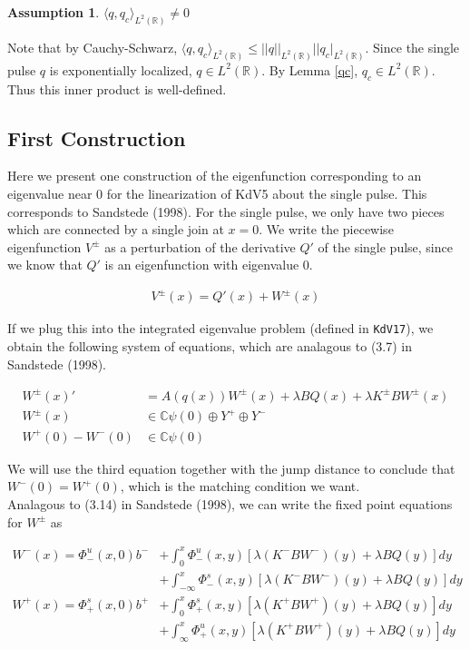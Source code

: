 \documentclass[12pt]{article}
\def\R{{\mathbb R}}
\def\C{{\mathbb C}}
\newtheorem{assumption}{Assumption}
\begin{document}
\begin{assumption}\label{qcIP}
$\langle q, q_c\rangle_{L^2(\R)} \neq 0$
\end{assumption}
Note that by Cauchy-Schwarz, $\langle q, q_c\rangle_{L^2(\R)} \leq ||q||_{L^2(\R)} ||q_c|_{L^2(\R)}$. Since the single pulse $q$ is exponentially localized, $q \in L^2(\R)$. By Lemma \ref{qc}, $q_c \in L^2(\R)$. Thus this inner product is well-defined.

\subsection*{First Construction}

Here we present one construction of the eigenfunction corresponding to an eigenvalue near 0 for the linearization of KdV5 about the single pulse. This corresponds to Sandstede (1998). For the single pulse, we only have two pieces which are connected by a single join at $x = 0$. We write the piecewise eigenfunction $V^\pm$ as a perturbation of the derivative $Q'$ of the single pulse, since we know that $Q'$ is an eigenfunction with eigenvalue 0. 

\begin{align*}
V^\pm(x) = Q'(x) + W^\pm(x)
\end{align*}

If we plug this into the integrated eigenvalue problem (defined in \texttt{KdV17}), we obtain the following system of equations, which are analagous to (3.7) in Sandstede (1998).

\begin{align*}
W^\pm(x)' &= A(q(x)) W^\pm(x) + \lambda B Q(x) + \lambda K^\pm B W^\pm(x) \\
W^\pm(x) &\in \C \psi(0) \oplus Y^+ \oplus Y^- \\
W^+(0) - W^-(0) &\in \C \psi(0) 
\end{align*}

We will use the third equation together with the jump distance to conclude that $W^-(0) = W^+(0)$, which is the matching condition we want.\\

Analagous to (3.14) in Sandstede (1998), we can write the fixed point equations for $W^\pm$ as

\begin{align*}
W^-(x) = \Phi^u_-(x, 0)b^- &+ \int_0^x \Phi^u_-(x, y)[\lambda (K^- B W^-)(y) + \lambda B Q(y) ] dy \\
&+ \int_{-\infty}^x \Phi^s_-(x, y)[\lambda (K^- B W^-)(y) + \lambda B Q(y) ] dy \\
W^+(x) = \Phi^s_+(x, 0)b^+ &+ \int_0^x \Phi^s_+(x, y)[\lambda (K^+ B W^+)(y) + \lambda B Q(y) ] dy \\
&+ \int_{\infty}^x \Phi^u_+(x, y)[\lambda (K^+ B W^+)(y) + \lambda B Q(y) ] dy
\end{align*}
\end{document}
